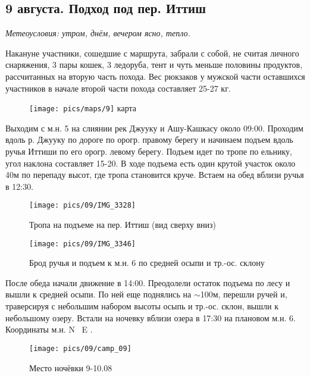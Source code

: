 \subsection{9 августа. Подход под пер. Иттиш}
\textit{Метеоусловия: утром, днём, вечером ясно, тепло.}

Накануне участники, сошедшие с маршрута, забрали с собой, не считая личного снаряжения, 3 пары кошек, 3 ледоруба, тент и чуть меньше половины продуктов, рассчитанных на вторую часть похода. Вес рюкзаков у мужской части оставшихся участников в начале второй части похода составляет 25-27 кг.

\begin{figure}[h!]
	\centering
	\texttt{[image: pics/maps/9]}
	\alert{карта}
	\label{fig:mini_9}
\end{figure}

Выходим с м.н. 5 на слиянии рек Джууку и Ашу-Кашкасу \alert{около 09:00}. Проходим вдоль р. Джууку по дороге по орогр. правому берегу и начинаем подъем вдоль ручья Иттиши по его орогр. левому берегу. Подъем идет по тропе по ельнику, угол наклона составляет 15-20\degree. В ходе подъема есть один крутой участок около 40м по перепаду высот, где тропа становится круче. Встаем на обед вблизи ручья \alert{в 12:30}.

\begin{figure}[h!]
	\centering
	\texttt{[image: pics/09/IMG\_3328]}
	\caption{Тропа на подъеме на пер. Иттиш (вид сверху вниз)}
	\label{fig:IMG_3328}
\end{figure}

\begin{figure}[h!]
	\centering
	\texttt{[image: pics/09/IMG\_3346]}
	\caption{Брод ручья и подъем к м.н. 6 по средней осыпи и тр.-ос. склону}
	\label{fig:IMG_3346}
\end{figure}


После обеда начали движение в \alert{14:00}. Преодолели остаток подъема по лесу и вышли к средней осыпи. По ней еще поднялись на $\sim$100м, перешли ручей и, траверсируя с небольшим набором высоты осыпь и тр.-ос. склон, вышли к небольшому озеру. Встали на ночевку вблизи озера в \alert{17:30} на плановом м.н. 6. Координаты м.н. \alert{N \degree~E \degree}.


\begin{figure}[h!]
	\centering
	\texttt{[image: pics/09/camp\_09]} %
	\caption{Место ночёвки 9-10.08}
	\label{fig:camp_09}
\end{figure}

\clearpage
